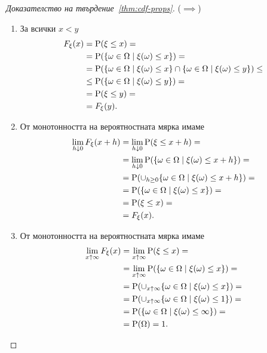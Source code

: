 \documentclass[numbers=endperiod, bibliography=totocnumbered]{scrartcl}
\begin{document}
\begin{proof}[Доказателство на твърдение~\ref{thm:cdf-props}]
  (\( \implies \))
  \begin{enumerate}
    \item За всички \( x < y \)
    \begin{align*}
      F_\xi(x)
      &=
      \operatorname{P}(\xi \leq x)
      = \\ &=
      \operatorname{P}(\{ \omega \in \Omega \mid \xi(\omega) \leq x \})
      = \\ &=
      \operatorname{P}(\{ \omega \in \Omega \mid \xi(\omega) \leq x \} \cap \{ \omega \in \Omega \mid \xi(\omega) \leq y \})
      \leq \\ &\leq
      \operatorname{P}(\{ \omega \in \Omega \mid \xi(\omega) \leq y \})
      = \\ &=
      \operatorname{P}(\xi \leq y)
      = \\ &=
      F_\xi(y).
    \end{align*}

    \item От монотонността на вероятностната мярка имаме
    \begin{align*}
      \lim_{h \downarrow 0} F_\xi(x + h)
      &=
      \lim_{h \downarrow 0} \operatorname{P}(\xi \leq x + h)
      = \\ &=
      \lim_{h \downarrow 0} \operatorname{P}(\{ \omega \in \Omega \mid \xi(\omega) \leq x + h \})
      = \\ &=
      \operatorname{P}(\cup_{h \geq 0} \{ \omega \in \Omega \mid \xi(\omega) \leq x + h \})
      = \\ &=
      \operatorname{P}(\{ \omega \in \Omega \mid \xi(\omega) \leq x \})
      = \\ &=
      \operatorname{P}(\xi \leq x)
      = \\ &=
      F_\xi(x).
    \end{align*}

    \item От монотонността на вероятностната мярка имаме
    \begin{align*}
      \lim_{x \uparrow \infty} F_\xi(x)
      &=
      \lim_{x \uparrow \infty} \operatorname{P}(\xi \leq x)
      = \\ &=
      \lim_{x \uparrow \infty} \operatorname{P}(\{ \omega \in \Omega \mid \xi(\omega) \leq x \})
      = \\ &=
      \operatorname{P}(\cup_{x \uparrow \infty} \{ \omega \in \Omega \mid \xi(\omega) \leq x \})
      = \\ &=
      \operatorname{P}(\cup_{x \uparrow \infty} \{ \omega \in \Omega \mid \xi(\omega) \leq 1 \})
      = \\ &=
      \operatorname{P}(\{ \omega \in \Omega \mid \xi(\omega) \leq \infty \})
      = \\ &=
      \operatorname{P}(\Omega)
      =
      1.
    \end{align*}


\end{enumerate}
\end{proof}
\end{document}

